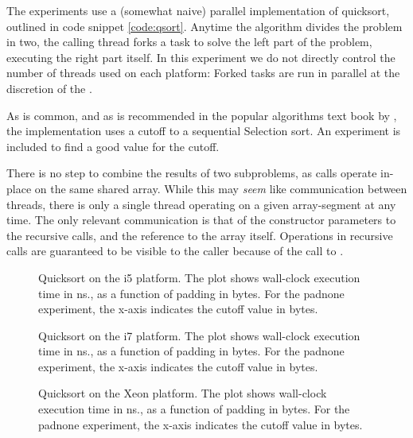 The experiments use a (somewhat naive) parallel implementation of quicksort,
outlined in code snippet \ref{code:qsort}.
Anytime the algorithm divides the problem in two, the calling thread forks a
task to solve the left part of the problem, executing the right part itself.
In this experiment we do not directly control the number of threads used on each
platform: Forked tasks are run in parallel at the discretion of the
.

As is common, and as is recommended in the popular algorithms text book by
\citet{sedgewick}, the implementation uses a cutoff to a sequential Selection
sort. An experiment is included to find a good value for the cutoff.

There is no step to combine the results of two subproblems, as calls operate
in-place on the same shared array. While this may \textit{seem} like communication
between threads, there is only a single thread operating on a given
array-segment at any time. The only relevant communication is that of the
constructor parameters to the recursive calls, and the reference to the array
itself. Operations in recursive calls are guaranteed to be visible to the caller
because of the call to .

\begin{figure}[hbpt]
\graphicspath{{plots/}}

	\caption{Quicksort on the i5 platform. The plot shows wall-clock execution time in
	ns., as a function of padding in bytes. For the padnone experiment, the
	x-axis indicates the cutoff value in bytes.}
	\label{fig:qsort-i5}
\end{figure}

\begin{figure}[hbpt]
\graphicspath{{plots/}}

	\caption{Quicksort on the i7 platform. The plot shows wall-clock execution time in
	ns., as a function of padding in bytes. For the padnone experiment, the
	x-axis indicates the cutoff value in bytes.}
	\label{fig:qsort-i7}
\end{figure}

\begin{figure}[hbpt]
\graphicspath{{plots/}}

	\caption{Quicksort on the Xeon platform. The plot shows wall-clock execution time in
	ns., as a function of padding in bytes. For the padnone experiment, the
	x-axis indicates the cutoff value in bytes.}
	\label{fig:qsort-xeon}
\end{figure}

